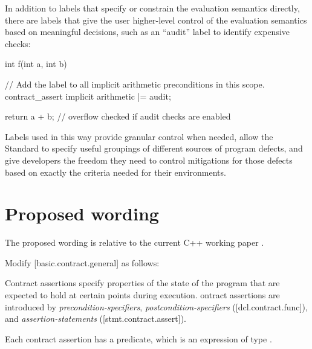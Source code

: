 In addition to labels that specify or constrain the evaluation semantics directly, there are labels that give the user higher-level control of the evaluation semantics based on meaningful decisions, such as an ``audit'' label to identify expensive checks:

\begin{codeblock}
int f(int a, int b)
{
    // Add the  label to all implicit arithmetic preconditions in this scope.
    contract_assert implicit arithmetic |= audit;

    return a + b;  // overflow checked if audit checks are enabled
}
\end{codeblock}

Labels used in this way provide granular control when needed, allow the Standard to
specify useful groupings of different sources of program defects, and give developers the freedom they
need to control mitigations for those defects based on exactly the criteria needed for their environments.

\section{Proposed wording}
\label{wording}

The proposed wording is relative to the current C++ working paper \cite{N5008}.

Modify [basic.contract.general] as follows:

\begin{adjustwidth}{0.5cm}{0.5cm}
Contract assertions specify properties of the state of the program
that are expected to hold at certain points during execution. ontract assertions
are introduced by \emph{precondition-specifiers}, \emph{postcondition-specifiers} ([dcl.contract.func]),
and \emph{assertion-statements} ([stmt.contract.assert]). 

Each contract assertion has a predicate, which is an expression of type . 
\begin{note}
\end{note}
\end{adjustwidth}

